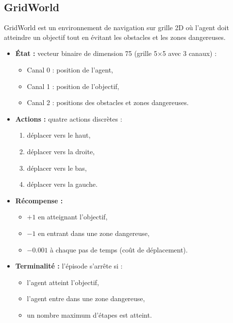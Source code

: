 \subsection{GridWorld}

GridWorld est un environnement de navigation sur grille 2D où l'agent doit atteindre un objectif tout en évitant les obstacles et les zones dangereuses.

\begin{itemize}
    \item[] \textbf{État :} vecteur binaire de dimension 75 (grille 5×5 avec 3 canaux) :
    \begin{itemize}
        \item Canal 0 : position de l'agent,
        \item Canal 1 : position de l'objectif,
        \item Canal 2 : positions des obstacles et zones dangereuses.
    \end{itemize}

    \item[] \textbf{Actions :} quatre actions discrètes :
    \begin{enumerate}
        \item déplacer vers le haut,
        \item déplacer vers la droite,
        \item déplacer vers le bas,
        \item déplacer vers la gauche.
    \end{enumerate}

    \item[] \textbf{Récompense :}
    \begin{itemize}
        \item $+1$ en atteignant l'objectif,
        \item $-1$ en entrant dans une zone dangereuse,
        \item $-0.001$ à chaque pas de temps (coût de déplacement).
    \end{itemize}

    \item[] \textbf{Terminalité :} l'épisode s'arrête si :
    \begin{itemize}
        \item[] l'agent atteint l'objectif,
        \item[] l'agent entre dans une zone dangereuse,
        \item[] un nombre maximum d'étapes est atteint.
    \end{itemize}
\end{itemize}


